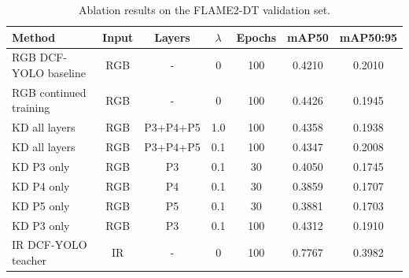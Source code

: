 \begin{table}[t]
\centering
\caption{Ablation results on the FLAME2-DT validation set.}
\label{tab:ablation}
\begin{tabular}{lcccccc}
\toprule
Method & Input & Layers & $\lambda$ & Epochs & mAP50 & mAP50:95 \\
\midrule
RGB DCF-YOLO baseline & RGB & - & 0 & 100 & 0.4210 & 0.2010 \\
RGB continued training & RGB & - & 0 & 100 & 0.4426 & 0.1945 \\
KD all layers & RGB & P3+P4+P5 & 1.0 & 100 & 0.4358 & 0.1938 \\
KD all layers & RGB & P3+P4+P5 & 0.1 & 100 & 0.4347 & 0.2008 \\
KD P3 only & RGB & P3 & 0.1 & 30 & 0.4050 & 0.1745 \\
KD P4 only & RGB & P4 & 0.1 & 30 & 0.3859 & 0.1707 \\
KD P5 only & RGB & P5 & 0.1 & 30 & 0.3881 & 0.1703 \\
KD P3 only & RGB & P3 & 0.1 & 100 & 0.4312 & 0.1910 \\
IR DCF-YOLO teacher & IR & - & 0 & 100 & 0.7767 & 0.3982 \\
\bottomrule
\end{tabular}
\end{table}

